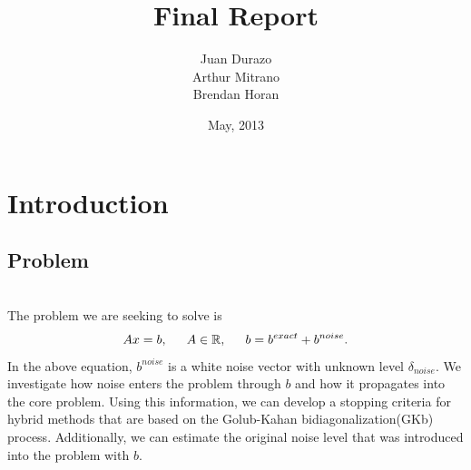 \documentclass[11pt]{amsart}
\title{Final Report}
\author{Juan Durazo \\ Arthur Mitrano \\ Brendan Horan}
\date{May, 2013}
\begin{document}
\maketitle

\section{Introduction}
\subsection{Problem} \indent \\
The problem we are seeking to solve is 
\begin{equation*}
  Ax=b, \indent A  \in  \mathbb{R}, \indent b = b^{exact} + b^{noise}.
\end{equation*}
In the above equation, $b^{noise}$ is a white noise vector with unknown level 
$\delta_{noise}$. We investigate how noise enters the problem through $b$ and 
how it propagates into the core problem. Using this information, we can develop
a stopping criteria for hybrid methods that are based on the Golub-Kahan 
bidiagonalization(GKb) process. Additionally, we can estimate the original noise
level that was introduced into the problem with $b$.
\end{document}
